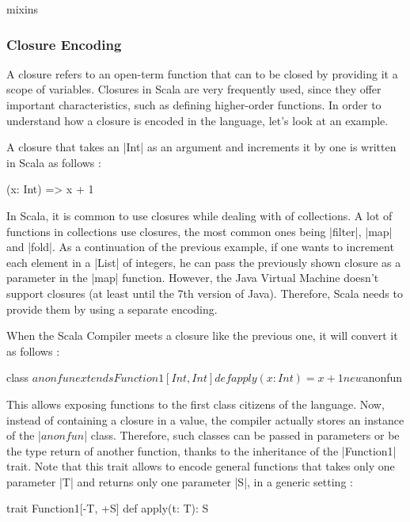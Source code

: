 mixins \cite{scalable-component-abstractions}

\subsubsection{Closure Encoding}

A closure refers to an open-term function that can to be closed by providing it a scope of variables. Closures in Scala are very frequently used, since they offer important characteristics, such as defining higher-order functions. In order to understand how a closure is encoded in the language, let's look at an example.

A closure that takes an |Int| as an argument and increments it by one is written in Scala as follows :

\begin{lstlisting-nobreak}
 (x: Int) => x + 1
\end{lstlisting-nobreak}

In Scala, it is common to use closures while dealing with of collections. A lot of functions in collections use closures, the most common ones being |filter|, |map| and |fold|. As a continuation of the previous example, if one wants to increment each element in a |List| of integers, he can pass the previously shown closure as a parameter in the |map| function. However, the Java Virtual Machine doesn't support closures (at least until the 7th version of Java). Therefore, Scala needs to provide them by using a separate encoding.

When the Scala Compiler meets a closure like the previous one, it will convert it as follows :

\begin{lstlisting-nobreak}
 {
  class $anonfun extends Function1[Int, Int] {
    def apply(x: Int) = x + 1
  }

  new $anonfun
 }
\end{lstlisting-nobreak}

This allows exposing functions to the first class citizens of the language. Now, instead of containing a closure in a value, the compiler actually stores an instance of the |$anonfun$| class. Therefore, such classes can be passed in parameters or be the type return of another function, thanks to the inheritance of the |Function1| trait. Note that this trait allows to encode general functions that takes only one parameter |T| and returns only one parameter |S|, in a generic setting :

\begin{lstlisting-nobreak}
 trait Function1[-T, +S] {
   def apply(t: T): S
 }
\end{lstlisting-nobreak}

